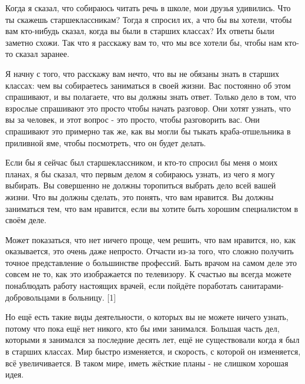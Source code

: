 \documentclass[ebook,12pt,oneside,openany]{memoir}
\author{Пол Грэм} \date{}
\begin{document}
\maketitle

Когда я сказал, что собираюсь читать речь в школе, мои друзья
удивились. Что ты скажешь старшеклассникам? Тогда я спросил их, а что
бы вы хотели, чтобы вам кто-нибудь сказал, когда вы были в старших
классах? Их ответы были заметно схожи. Так что я расскажу вам то, что
мы все хотели бы, чтобы нам кто-то сказал заранее. \newline

Я начну с того, что расскажу вам нечто, что вы не обязаны знать в
старших классах: чем вы собираетесь заниматься в своей жизни. Вас
постоянно об этом спрашивают, и вы полагаете, что вы должны знать
ответ. Только дело в том, что взрослые спрашивают это просто чтобы
начать разговор. Они хотят узнать, что вы за человек, и этот вопрос -
это просто, чтобы разговорить вас. Они спрашивают это примерно так же,
как вы могли бы тыкать краба-отшельника в приливной яме, чтобы
посмотреть, что он будет делать. \newline

Если бы я сейчас был старшеклассником, и кто-то спросил бы меня о моих
планах, я бы сказал, что первым делом я собираюсь узнать, из чего я
могу выбирать. Вы совершенно не должны торопиться выбрать дело всей
вашей жизни. Что вы должны сделать, это понять, что вам нравится. Вы
должны заниматься тем, что вам нравится, если вы хотите быть хорошим
специалистом в своём деле. \newline

Может показаться, что нет ничего проще, чем решить, что вам нравится,
но, как оказывается, это очень даже непросто. Отчасти из-за того, что
сложно получить точное представление о большинстве профессий. Быть
врачом на самом деле это совсем не то, как это изображается по
телевизору. К счастью вы всегда можете понаблюдать работу настоящих
врачей, если пойдёте поработать санитарами-добровольцами в больницу.
[1] \newline

Но ещё есть такие виды деятельности, о которых вы не можете ничего
узнать, потому что пока ещё нет никого, кто бы ими занимался. Большая
часть дел, которыми я занимался за последние десять лет, ещё не
существовали когда я был в старших классах. Мир быстро изменяется, и
скорость, с которой он изменяется, всё увеличивается. В таком мире,
иметь жёсткие планы - не слишком хорошая идея. \newline
\end{document}
